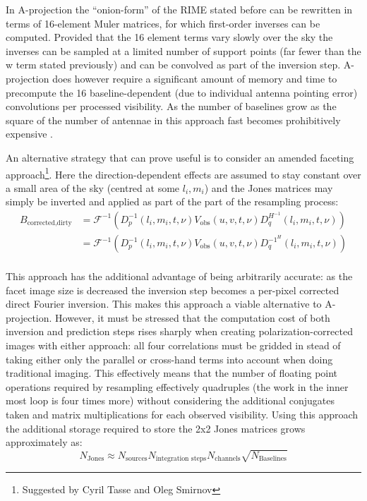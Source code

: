 In A-projection the ``onion-form'' of the RIME stated before can be rewritten in terms of 16-element Muler matrices, for which first-order 
inverses can be computed. Provided that the 16 element terms vary slowly over the sky the inverses can be sampled at a limited number
of support points (far fewer than the w term stated previously) and can be convolved as part of the inversion step. A-projection does 
however require a significant amount of memory and time to precompute the 16 baseline-dependent (due to individual antenna pointing error) 
convolutions per processed visibility. As the number of baselines grow as the square of the number of antennae in this approach fast 
becomes prohibitively expensive \cite{tasse2013applying}.

An alternative strategy that can prove useful is to consider an amended faceting approach\footnote{Suggested by Cyril Tasse and Oleg Smirnov}. Here the 
direction-dependent effects are assumed to stay constant over a small area of the sky (centred at some $l_i,m_i$) and the Jones 
matrices may simply be inverted and applied as part of the part of the resampling process:
\begin{equation*}
 \begin{split}
 B_{\text{corrected,dirty}} &= \mathcal{F}^{-1}(D_p^{-1}(l_i,m_i,t,\nu)V_{\text{obs}}(u,v,t,\nu)D_q^{H^{-1}}(l_i,m_i,t,\nu))\\
			    &= \mathcal{F}^{-1}(D_p^{-1}(l_i,m_i,t,\nu)V_{\text{obs}}(u,v,t,\nu)D_q^{{-1}^H}(l_i,m_i,t,\nu))\\
 \end{split}
\end{equation*}

This approach has the additional advantage of being arbitrarily accurate: as the facet image size is decreased the inversion step
becomes a per-pixel corrected direct Fourier inversion. This makes this approach a viable alternative to A-projection. However, 
it must be stressed that the computation cost of both inversion and prediction steps rises sharply when creating polarization-corrected 
images with either approach: all four correlations must be gridded in stead of taking either only the parallel or cross-hand terms into 
account when doing traditional imaging. This effectively means that the number of floating point operations required by resampling 
effectively quadruples (the work in the inner most loop is four times more) without considering the additional conjugates taken and 
matrix multiplications for each observed visibility. Using this approach the additional storage required to store the 2x2 Jones 
matrices grows approximately as:
\begin{equation*}
 N_{\text{Jones}} \approx N_{\text{sources}}N_{\text{integration steps}}N_{\text{channels}}\sqrt{N_{\text{Baselines}}}
\end{equation*}


